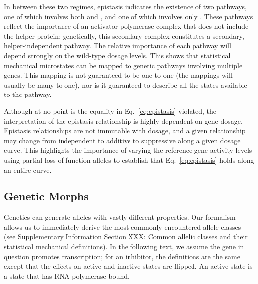 In between these two regimes, epistasis indicates the existence of two pathways,
one of which involves both  and , and one of which involves only
. These pathways reflect the importance of an activator-polymerase
complex that does not include the helper protein; genetically, this secondary
complex constitutes a secondary, helper-independent pathway. The relative
importance of each pathway will depend strongly on the wild-type dosage levels.
This shows that statistical mechanical microstates can be mapped to genetic
pathways involving multiple genes. This mapping is not guaranteed to be
one-to-one (the mappings will usually be many-to-one), nor is it guaranteed to
describe all the states available to the pathway.

Although at no point is the equality in Eq.~\ref{eq:epistasis} violated, the
interpretation of the epistasis relationship is highly dependent on gene dosage.
Epistasis relationships are not immutable with dosage, and a given relationship
may change from independent to additive to suppressive along a given dosage
curve. This highlights the importance of varying the reference gene activity
levels using partial loss-of-function alleles to establish that
Eq.~\ref{eq:epistasis} holds along an entire curve.

\subsection*{Genetic Morphs}
Genetics can generate alleles with vastly different properties. Our formalism
allows us to immediately derive the most commonly encountered allele classes
(see Supplementary Information Section XXX: Common allelic classes and their
statistical mechanical definitions). In the following text, we assume the gene
in question promotes transcription; for an inhibitor, the definitions are the
same except that the effects on active and inactive states are flipped. An
active state is a state that has RNA polymerase bound.

